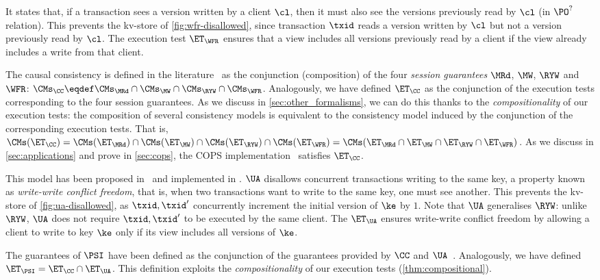 

It states that, if a transaction sees a version written by a
client $\cl$, then it must also see the versions previously read by $\cl$ (in $\PO^?$ relation).
This prevents the kv-store of \cref{fig:wfr-disallowed},
since transaction $\txid$ reads a version written by $\cl$ but
not a version previously read by $\cl$.
The execution test $\ET_{\WFR}$ ensures
that a view includes all versions previously read by a client 
if the view already includes a write from that client. 


The causal consistency is defined in the literature~\cite{session2causal} 
as the conjunction (composition) of the four \emph{session guarantees} \(\MRd\), \(\MW\), \(\RYW\) and \(\WFR\):   
$\CMs_{\CC} \eqdef \CMs_{\MRd} \cap \CMs_{\MW} \cap \CMs_{\RYW} \cap \CMs_{\WFR}$. 
Analogously, we have defined $\ET_\CC$ as the conjunction of the execution tests corresponding to the four session guarantees.
As we discuss in \cref{sec:other_formalisms}, we can do this thanks to the \emph{compositionality} of our execution tests:
the composition of several consistency models is equivalent to the consistency model induced by the conjunction of the corresponding execution tests. 
That is, $\CMs(\ET_\CC) = \CMs(\ET_{\MRd}) \cap \CMs(\ET_{\MW}) \cap
\CMs(\ET_{\RYW}) \cap \CMs(\ET_{\WFR}) = \CMs(\ET_{\MRd} \cap
\ET_{\MW} \cap \ET_{\RYW} \cap \ET_{\WFR})$.
As we discuss in \cref{sec:applications} and prove in \ref{sec:cops}, the COPS
implementation~\cite{cops} satisfies $\ET_{\CC}$. 

This model has been proposed in~\cite{framework-concur} 
and implemented in \cite{rola}.
$\UA$ disallows concurrent transactions writing to the same key,
a property known as \emph{write-write conflict freedom}, that is, 
when two transactions want to write to the same key, one must see another.
This prevents the kv-store of \cref{fig:ua-disallowed},
as $\txid, \txid'$ concurrently increment the initial version of $\ke$ by $1$.
Note that $\UA$ generalises $\RYW$: unlike $\RYW$, $\UA$ does not require $\txid, \txid'$ to be executed by the same client.
The $\ET_\UA$ ensures write-write conflict freedom by allowing a client to write to key $\ke$
only if its view includes all versions of $\ke$.

The guarantees of $\PSI$ have been defined as the conjunction of the guarantees provided by $\CC$ and $\UA$~\cite{framework-concur}.
Analogously, we have defined $\ET_\PSI = \ET_\CC \cap \ET_\UA$. 
This definition exploits the \emph{compositionality} of our execution tests (\cref{thm:compositional}).

